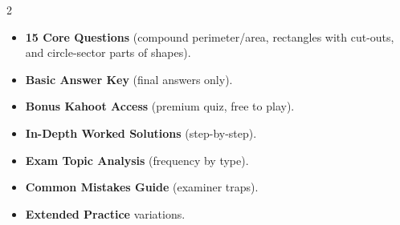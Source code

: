 \documentclass[11pt,a4paper]{article}
\newcommand{\FullReleaseDate}{April 30, 2026}
\begin{document}
\vspace{8pt}

\begin{multicols}{2}
  \begin{tcolorbox}[card, title=\sffamily\bfseries\textcolor{white}{\faHandPointDown\ TODAY (Simplified Version)}, colbacktitle=mainblue, boxed title style={sharp corners, boxrule=0pt}]
    \begin{itemize}[leftmargin=1.2em, itemsep=2pt]
      \item \small \textbf{15 Core Questions} (compound perimeter/area, rectangles with cut-outs, and circle-sector parts of shapes).
      \item \small \textbf{Basic Answer Key} (final answers only).
      \item \small \textbf{Bonus Kahoot Access} (premium quiz, free to play).
    \end{itemize}
  \end{tcolorbox}

  \columnbreak

  \begin{tcolorbox}[card, title=\sffamily\bfseries\textcolor{white}{\faRocket\ ON \FullReleaseDate\ (Full Upgrade)}, colbacktitle=mainblue, boxed title style={sharp corners, boxrule=0pt}]
    \begin{itemize}[leftmargin=1.2em, itemsep=2pt]
      \item \small \textbf{In-Depth Worked Solutions} (step-by-step).
      \item \small \textbf{Exam Topic Analysis} (frequency by type).
      \item \small \textbf{Common Mistakes Guide} (examiner traps).
      \item \small \textbf{Extended Practice} variations.
    \end{itemize}
  \end{tcolorbox}
\end{multicols}
\end{document}
